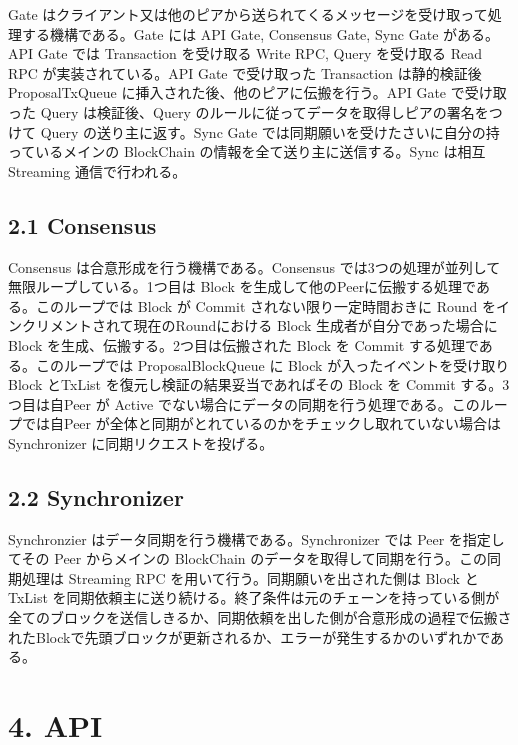 Gate
はクライアント又は他のピアから送られてくるメッセージを受け取って処理する機構である。Gate
には API Gate, Consensus Gate, Sync Gate がある。API Gate では
Transaction を受け取る Write RPC, Query を受け取る Read RPC
が実装されている。API Gate で受け取った Transaction は静的検証後
ProposalTxQueue に挿入された後、他のピアに伝搬を行う。API Gate
で受け取った Query は検証後、Query
のルールに従ってデータを取得しピアの署名をつけて Query
の送り主に返す。Sync Gate
では同期願いを受けたさいに自分の持っているメインの BlockChain
の情報を全て送り主に送信する。Sync は相互 Streaming 通信で行われる。

\hypertarget{consensus}{%
\section{2.1 Consensus}\label{consensus}}

Consensus は合意形成を行う機構である。Consensus
では3つの処理が並列して無限ループしている。1つ目は Block
を生成して他のPeerに伝搬する処理である。このループでは Block が Commit
されない限り一定時間おきに Round
をインクリメントされて現在のRoundにおける Block
生成者が自分であった場合に Block を生成、伝搬する。2つ目は伝搬された
Block を Commit する処理である。このループでは ProposalBlockQueue に
Block が入ったイベントを受け取り Block とTxList
を復元し検証の結果妥当であればその Block を Commit する。3つ目は自Peer
が Active でない場合にデータの同期を行う処理である。このループでは自Peer
が全体と同期がとれているのかをチェックし取れていない場合は Synchronizer
に同期リクエストを投げる。

\hypertarget{synchronizer}{%
\section{2.2 Synchronizer}\label{synchronizer}}

Synchronzier はデータ同期を行う機構である。Synchronizer では Peer
を指定してその Peer からメインの BlockChain
のデータを取得して同期を行う。この同期処理は Streaming RPC
を用いて行う。同期願いを出された側は Block と TxList
を同期依頼主に送り続ける。終了条件は元のチェーンを持っている側が全てのブロックを送信しきるか、同期依頼を出した側が合意形成の過程で伝搬されたBlockで先頭ブロックが更新されるか、エラーが発生するかのいずれかである。

\hypertarget{api}{%
\chapter{4. API}\label{api}}

